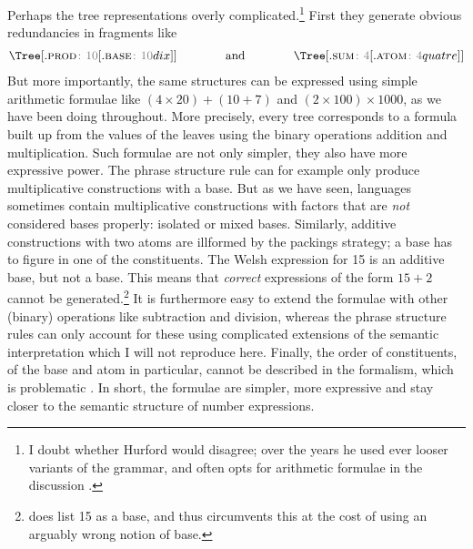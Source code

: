 \documentclass{../src/bcthesispart}
\begin{document}
Perhaps the tree representations overly complicated.\footnote{%
	I doubt whether Hurford would disagree; over the years he used ever looser variants of the grammar, and often opts for arithmetic formulae in the discussion \parencite{Hurford1999,Hurford2007}.
	
	}
First they generate obvious redundancies in fragments like
\begin{align}
	\label{eq:chains}
	\Tree [.\PROD{}\attr{10} [.\BASE{}\attr{10} dix ] ]
	\qquad\qquad\text{and}\qquad\qquad
	\Tree [.\SUM\attr{4} [.\ATOM{}\attr{4} quatre ] ]
\end{align}
But more importantly, the same structures can be expressed using simple arithmetic formulae like $(4 \times 20) + (10 + 7)$ and $(2 \times 100) \times 1000$, as we have been doing throughout. More precisely, every tree corresponds to a formula built up from the values of the leaves using the binary operations addition and multiplication.
Such formulae are not only simpler, they also have more expressive power. 
The phrase structure rule can for example only produce multiplicative constructions with a base. 
But as we have seen, languages sometimes contain multiplicative constructions with factors that are \emph{not} considered bases properly: isolated or mixed bases.
Similarly, additive constructions with two atoms are illformed by the packings strategy; a base has to figure in one of the constituents.
The Welsh expression for 15 is an additive base, but not a base. 
This means that \emph{correct} expressions of the form $15+2$ cannot be generated.\footnote{%
	\textcite{Hurford1975} does list 15 as a base, and thus circumvents this at the cost of using an arguably wrong notion of base.
	}
It is furthermore easy to extend the formulae with other (binary) operations like subtraction and division, whereas the phrase structure rules can only account for these using complicated extensions of the semantic interpretation which I will not reproduce here.
Finally, the order of constituents, of the base and atom in particular, cannot be described in the formalism, which is problematic \parencite{Calude2016}. 
In short, the formulae are simpler, more expressive and stay closer to the semantic structure of number expressions.
\end{document}
